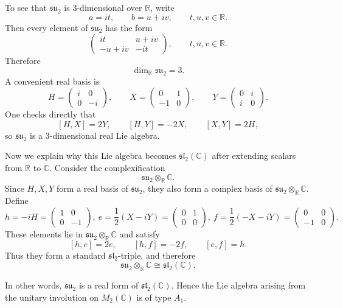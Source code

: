 \begin{example}
    To see that $\mathfrak{su}_{2}$ is $3$-dimensional over $\mathbb{R}$, write
    \[
        a=it,\qquad b=u+iv,
        \qquad t,u,v\in\mathbb{R}.
    \]
    Then every element of $\mathfrak{su}_{2}$ has the form
    \[
        \begin{pmatrix}
            it    & u+iv \\
            -u+iv & -it
        \end{pmatrix},
        \qquad t,u,v\in\mathbb{R}.
    \]
    Therefore
    \[
        \dim_{\mathbb{R}}\mathfrak{su}_{2}=3.
    \]
    A convenient real basis is
    \[
        H=
        \begin{pmatrix}
            i & 0  \\
            0 & -i
        \end{pmatrix},
        \qquad
        X=
        \begin{pmatrix}
            0  & 1 \\
            -1 & 0
        \end{pmatrix},
        \qquad
        Y=
        \begin{pmatrix}
            0 & i \\
            i & 0
        \end{pmatrix}.
    \]
    One checks directly that
    \[
        [H,X]=2Y,\qquad [H,Y]=-2X,\qquad [X,Y]=2H,
    \]
    so $\mathfrak{su}_{2}$ is a $3$-dimensional real Lie algebra.

    Now we explain why this Lie algebra becomes $\mathfrak{sl}_{2}(\mathbb{C})$ after extending scalars
    from $\mathbb{R}$ to $\mathbb{C}$. Consider the complexification
    \[
        \mathfrak{su}_{2}\otimes_{\mathbb{R}}\mathbb{C}.
    \]
    Since $H,X,Y$ form a real basis of $\mathfrak{su}_{2}$, they also form a complex basis of
    $\mathfrak{su}_{2}\otimes_{\mathbb{R}}\mathbb{C}$. Define
    \[
        h=-iH=
        \begin{pmatrix}
            1 & 0  \\
            0 & -1
        \end{pmatrix},
        \
        e=\frac{1}{2}(X-iY)=
        \begin{pmatrix}
            0 & 1 \\
            0 & 0
        \end{pmatrix},
        \
        f=\frac{1}{2}(-X-iY)=
        \begin{pmatrix}
            0  & 0 \\
            -1 & 0
        \end{pmatrix}.
    \]
    These elements lie in $\mathfrak{su}_{2}\otimes_{\mathbb{R}}\mathbb{C}$ and satisfy
    \[
        [h,e]=2e,\qquad [h,f]=-2f,\qquad [e,f]=h.
    \]
    Thus they form a standard $\mathfrak{sl}_{2}$-triple, and therefore
    \[
        \mathfrak{su}_{2}\otimes_{\mathbb{R}}\mathbb{C}\cong \mathfrak{sl}_{2}(\mathbb{C}).
    \]

    In other words, $\mathfrak{su}_{2}$ is a real form of $\mathfrak{sl}_{2}(\mathbb{C})$. Hence the Lie
    algebra arising from the unitary involution on $M_{2}(\mathbb{C})$ is of type $A_{1}$.
\end{example}


